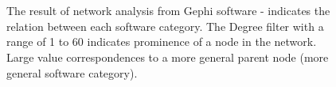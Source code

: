 \begin{figure}[h]
	\myfloatalign
	 \quad
	 \\
	\\
	\caption[Subfloat - Figure]{The result of network analysis from Gephi software - indicates the relation between each software category. The Degree filter with a range of 1 to 60 indicates prominence of a node in the network. Large value correspondences to a more general parent node (more general software category).}

\end{figure}


